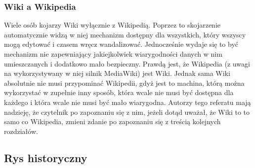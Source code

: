 \documentclass{article}
\begin{document}
	\subsubsection{Wiki a Wikipedia}
	Wiele osób kojarzy Wiki wyłącznie z Wikipedią. Poprzez to skojarzenie automatycznie widzą w niej mechanizm dostępny dla wszystkich, który wszyscy mogą edytować i czasem wręcz wandalizować. Jednocześnie wydaje się to być mechanizm nie zapewniający jakiejkolwiek wiarygodności danych w nim umieszczanych i dodatkowo mało bezpieczny. Prawdą jest, że Wikipedia (z uwagi na wykorzystywany w niej silnik MediaWiki) jest Wiki. Jednak sama Wiki absolutnie nie musi przypominać Wikipedii, gdyż jest to machina, którą można wykorzystać w zupełnie inny sposób, która wcale nie musi być dostępna dla każdego i która wcale nie musi być mało wiarygodna. Autorzy tego referatu mają nadzieję, że czytelnik po zapoznaniu się z nim, jeżeli dotąd uważał, że Wiki to to samo co Wikipedia, zmieni zdanie po zapoznaniu się z treścią kolejnych rozdziałów.
	\subsection{Rys historyczny}
\end{document}
